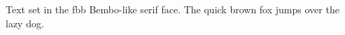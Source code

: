 \documentclass{article}
\begin{document}
Text set in the fbb Bembo-like serif face.
The quick brown fox jumps over the lazy dog.
\end{document}
